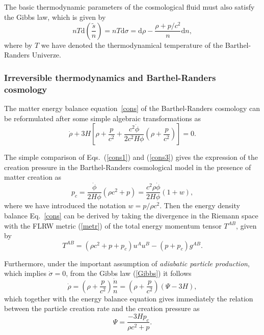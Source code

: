 \documentclass[aps,superscriptaddress, showpacs,preprintnumbers, superscriptaddress, nofootinbibt,twocolumn]{revtex4-2}
\def\be{\begin{equation}}
\def\ee{\end{equation}}
\begin{document}
The basic thermodynamic parameters of the cosmological fluid must also satisfy the Gibbs law, which is given by \cite{Lima}
\begin{equation}\label{Gibbs}
n T \mathrm{d} \left(\frac{\tilde{s}}{n}\right)=nT\mathrm{d}\sigma=\mathrm{d}\rho -\frac{\rho+p/c^2}{n}\mathrm{d}n,
\end{equation}
where by $T$ we have denoted the thermodynamical temperature of the Barthel-Randers Univerze.

\subsubsection{Irreversible thermodynamics and Barthel-Randers cosmology}

The matter energy balance equation~\eqref{cons} of the Barthel-Randers cosmology can be reformulated after some simple algebraic transformations as
\begin{equation}\label{cons3}
\dot{\rho}+3H\left[\rho +\frac{p}{c^2}+\frac{c^2\dot{\phi}}{2c^2H\phi}\left(\rho +\frac{p}{c^2}\right)\right] =0.
\end{equation}%

The simple comparison of Eqs.~(\ref{cons1}) and (\ref{cons3}) gives the expression of the creation pressure in the Barthel-Randers cosmological model in the presence of matter creation as
\be\label{pc}
p_{c}=\frac{\dot{\phi}}{2H\phi}\left(\rho c^2+p\right)=\frac{c^2\rho \dot{\phi}}{2H\phi}\left(1+w\right),
\ee
where we have introduced the notation $w=p/\rho c^2$. Then the energy density balance Eq.~\eqref{cons}
can be derived by taking the divergence in the Riemann space with the FLRW metric (\ref{metr}) of the total energy momentum tensor $%
T^{AB}$, given by
\begin{equation}
T^{A B }=\left( \rho c^2 +p+p_{c}\right) u^{A }u^{B }-\left(
p+p_{c}\right) g^{A B }.
\end{equation}

Furthermore, under the important assumption of {\it adiabatic particle production},
which implies $\dot{\sigma}=0$, from the Gibbs law (\ref{Gibbs}) it follows
\begin{equation}
\dot{\rho}
=\left(\rho+\frac{p}{c^2}\right)\frac{\dot{n}}{n}
=\left(\rho+\frac{p}{c^2}\right)\left(\Psi-3H\right),
\end{equation}
which together with the energy balance equation gives immediately the
relation between the particle creation rate and the creation pressure as
\begin{equation}
\Psi=\frac{-3Hp_c}{\rho c^2+p}.
\end{equation}
\end{document}
